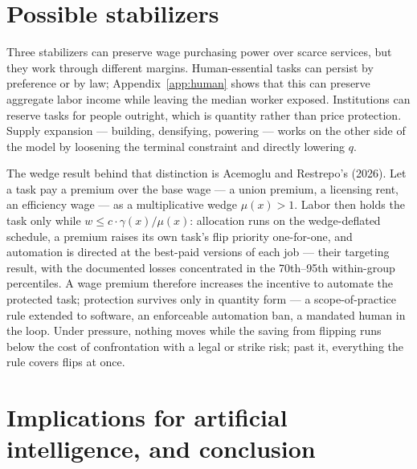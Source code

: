\documentclass[12pt]{article}
\theoremstyle{plain}
\begin{document}
\section{Possible stabilizers}\label{sec:stabilizers}

Three stabilizers can preserve wage purchasing power over scarce services, but they work through different margins. Human-essential tasks can persist by preference or by law; Appendix~\ref{app:human} shows that this can preserve aggregate labor income while leaving the median worker exposed. Institutions can reserve tasks for people outright, which is quantity rather than price protection. Supply expansion --- building, densifying, powering --- works on the other side of the model by loosening the terminal constraint and directly lowering $q$.

The wedge result behind that distinction is Acemoglu and Restrepo's (2026). Let a task pay a premium over the base wage --- a union premium, a licensing rent, an efficiency wage --- as a multiplicative wedge $\mu (x) > 1$. Labor then holds the task only while $w \le c\cdot \gamma (x)/\mu (x)$: allocation runs on the wedge-deflated schedule, a premium raises its own task's flip priority one-for-one, and automation is directed at the best-paid versions of each job --- their targeting result, with the documented losses concentrated in the 70th--95th within-group percentiles. A wage premium therefore increases the incentive to automate the protected task; protection survives only in quantity form --- a scope-of-practice rule extended to software, an enforceable automation ban, a mandated human in the loop. Under pressure, nothing moves while the saving from flipping runs below the cost of confrontation with a legal or strike risk; past it, everything the rule covers flips at once.

\section{Implications for artificial intelligence, and conclusion}\label{sec:ai}
\end{document}
